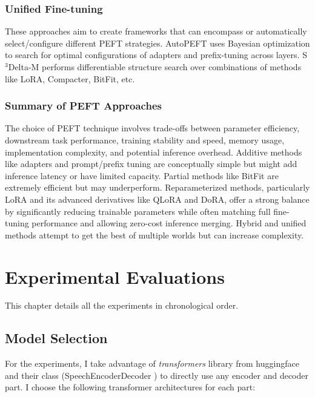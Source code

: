 \subsection{Unified Fine-tuning}
These approaches aim to create frameworks that can encompass or automatically select/configure different PEFT strategies. AutoPEFT \cite{Zhou_2024} uses Bayesian optimization to search for optimal configurations of adapters and prefix-tuning across layers. S\(^3\)Delta-M \cite{NEURIPS2022_4027fc45} performs differentiable structure search over combinations of methods like LoRA, Compacter, BitFit, etc.


\subsection{Summary of PEFT Approaches}
The choice of PEFT technique involves trade-offs between parameter efficiency, downstream task performance, training stability and speed, memory usage, implementation complexity, and potential inference overhead. Additive methods like adapters and prompt/prefix tuning are conceptually simple but might add inference latency or have limited capacity. Partial methods like BitFit are extremely efficient but may underperform. Reparameterized methods, particularly LoRA and its advanced derivatives like QLoRA and DoRA, offer a strong balance by significantly reducing trainable parameters while often matching full fine-tuning performance and allowing zero-cost inference merging. Hybrid and unified methods attempt to get the best of multiple worlds but can increase complexity.




\chapter{Experimental Evaluations}\label{experimentos}

This chapter details all the experiments in chronological order.  

\section{Model Selection}
For the experiments, I take advantage of \textit{transformers} library from huggingface and their class (SpeechEncoderDecoder \cite{huggingface2025transformers}) to directly use any encoder and decoder part. I choose the following transformer architectures for each part:

